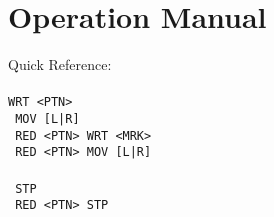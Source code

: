 \documentclass{article}
\begin{document}
    \section{Operation Manual}
    Quick Reference:\\~\\
    \texttt{WRT <PTN> }\\
    \texttt{ MOV [L|R] }\\
    \texttt{ RED <PTN> WRT <MRK> }\\
    \texttt{ RED <PTN> MOV [L|R] }\\~\\
    \texttt{ STP }\\
    \texttt{ RED <PTN> STP }
\end{document}
